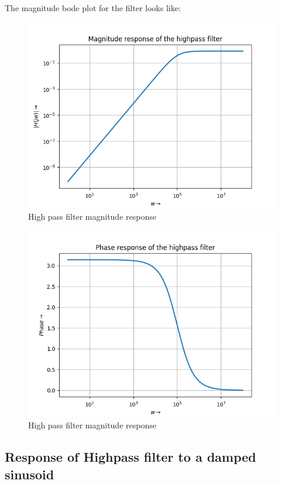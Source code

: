 \documentclass{article}
\begin{document}
The magnitude bode plot for the filter looks like:
\begin{figure}[h!]
\centering
\includegraphics[scale=0.6]{Figure_5.png}
\caption{High pass filter magnitude response}
\label{fig:High pass filter magnitude response}
\end{figure}
\begin{figure}[h!]
	\centering
	\includegraphics[scale=0.6]{Figure_6.png}
	\caption{High pass filter magnitude response}
	\label{fig:High pass filter magnitude response}
\end{figure}



\clearpage


\subsection{Response of Highpass filter to a damped sinusoid}
\end{document}
